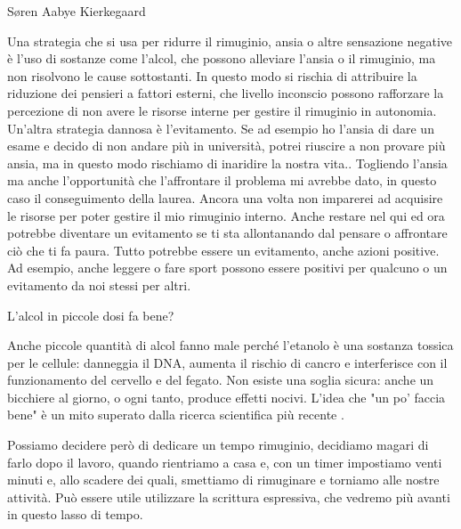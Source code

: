 \documentclass[12pt]{book} %
\begin{document}
Søren Aabye Kierkegaard

Una strategia che si usa per ridurre il rimuginio, ansia o altre sensazione negative è l'uso di sostanze come l'alcol,
che possono alleviare l’ansia o il rimuginio, ma non risolvono le cause sottostanti.
In questo modo si rischia di attribuire la riduzione dei pensieri a fattori esterni, che livello inconscio possono rafforzare la percezione di non avere le risorse interne per gestire il rimuginio in autonomia. Un'altra strategia dannosa è l'evitamento. Se ad esempio ho l'ansia di dare un esame e decido di non andare più in università, potrei riuscire a non provare più ansia, ma in questo modo rischiamo di inaridire la nostra vita.. Togliendo
l'ansia ma anche l'opportunità che l'affrontare il problema mi avrebbe dato, in questo caso il conseguimento della
laurea. Ancora una volta non imparerei ad acquisire le risorse per poter gestire il mio rimuginio interno.
Anche restare nel qui ed ora potrebbe diventare un evitamento se ti sta allontanando dal pensare o affrontare ciò che ti fa paura. 
Tutto potrebbe essere un evitamento, anche azioni positive. Ad esempio, anche leggere o fare sport possono essere positivi per qualcuno o un evitamento da noi stessi per altri.

\begin{mdframed}[linewidth=1pt]
L'alcol in piccole dosi fa bene?

Anche piccole quantità di alcol fanno male perché l’etanolo è una sostanza tossica per le cellule: danneggia il DNA, aumenta il rischio di cancro e interferisce con il funzionamento del cervello e del fegato. Non esiste una soglia sicura: anche un bicchiere al giorno, o ogni tanto, produce effetti nocivi. L’idea che "un po’ faccia bene" è un mito superato dalla ricerca scientifica più recente   .
\end{mdframed}

Possiamo decidere però di dedicare un tempo rimuginio, decidiamo magari di farlo dopo il lavoro, quando rientriamo a
casa e, con un timer impostiamo venti minuti e, allo scadere dei quali, smettiamo di rimuginare e torniamo alle nostre
attività. Può essere utile utilizzare la scrittura espressiva, che vedremo più avanti in questo lasso di tempo.
\end{document}
